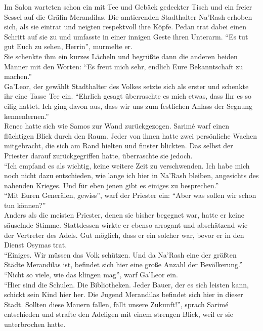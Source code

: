 Im Salon warteten schon ein mit Tee und Gebäck gedeckter Tisch und ein freier Sessel auf die Gräfin 
Merandilas. Die amtierenden Stadthalter Na'Rash erhoben sich, als sie eintrat und neigten 
respektvoll ihre Köpfe. Pedan trat dabei einen Schritt auf sie zu und umfasste in einer innigen 
Geste ihren Unterarm. ``Es tut gut Euch zu sehen, Herrin'', murmelte er.\\
Sie schenkte ihm ein kurzes Lächeln und begrüßte dann die anderen beiden Männer mit den Worten: 
``Es freut mich sehr, endlich Eure Bekanntschaft zu machen.''\\
Ga'Leor, der gewählt Stadthalter des Volkes setzte sich als erster und schenkte ihr eine Tasse Tee 
ein. ``Ehrlich gesagt überraschte es mich etwas, dass Ihr es so eilig hattet. Ich ging davon aus, 
dass wir uns zum festlichen Anlass der Segnung kennenlernen.''\\
Renec hatte sich wie Samos zur Wand zurückgezogen. Sarimé warf einen flüchtigen Blick durch den 
Raum. Jeder von ihnen hatte zwei persönliche Wachen mitgebracht, die sich am Rand hielten und 
finster blickten. Das selbst der Priester darauf zurückgegriffen hatte, überraschte sie jedoch.\\
``Ich empfand es als wichtig, keine weitere Zeit zu verschwenden. Ich habe mich noch nicht dazu 
entschieden, wie lange ich hier in Na'Rash bleiben, angesichts des nahenden Krieges. Und für eben 
jenen gibt es einiges zu besprechen.''\\
``Mit Euren Generälen, gewiss'', warf der Priester ein: ``Aber was sollen wir schon tun können?''\\
Anders als die meisten Priester, denen sie bisher begegnet war, hatte er keine säuselnde Stimme. 
Stattdessen wirkte er ebenso arrogant und abschätzend wie der Vertreter des Adels. Gut möglich, 
dass er ein solcher war, bevor er in den Dienst Osymas trat.\\
``Einiges. Wir müssen das Volk schützen. Und da Na'Rash eine der größten Städte Merandilas ist, 
befindet sich hier eine große Anzahl der Bevölkerung.''\\
``Nicht so viele, wie das klingen mag'', warf Ga'Leor ein.\\
``Hier sind die Schulen. Die Bibliotheken. Jeder Bauer, der es sich leisten kann, schickt sein Kind 
hier her. Die Jugend Merandilas befindet sich hier in dieser Stadt. Sollten diese Mauern fallen, 
fällt unsere Zukunft!'', sprach Sarimé entschieden und strafte den Adeligen mit einem strengen 
Blick, weil er sie unterbrochen hatte.\\
